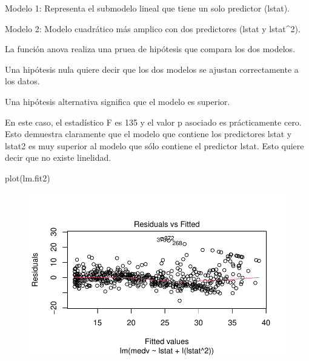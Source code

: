 \documentclass[
  letterpaper,
  DIV=11,
  numbers=noendperiod]{scrartcl}
\newenvironment{Shaded}{\begin{snugshade}}{\end{snugshade}}
\newcommand{\FunctionTok}[1]{\textcolor[rgb]{0.28,0.35,0.67}{#1}}
\newcommand{\NormalTok}[1]{\textcolor[rgb]{0.00,0.23,0.31}{#1}}
\begin{document}
Modelo 1: Representa el submodelo lineal que tiene un solo predictor
(lstat).

Modelo 2: Modelo cuadrático más amplico con dos predictores (lstat y
lstat\^{}2).

La función anova realiza una pruea de hipótesis que compara los dos
modelos.

Una hipótesis nula quiere decir que los dos modelos se ajustan
correctamente a los datos.

Una hipótesis alternativa significa que el modelo es superior.

En este caso, el estadístico F es 135 y el valor p asociado es
prácticamente cero. Esto demuestra claramente que el modelo que contiene
los predictores lstat y lstat2 es muy superior al modelo que sólo
contiene el predictor lstat. Esto quiere decir que no existe linelidad.

\begin{Shaded}
\begin{Highlighting}[]
\FunctionTok{plot}\NormalTok{(lm.fit2)}
\end{Highlighting}
\end{Shaded}

\begin{figure}[H]

{\centering \includegraphics{Resumen-2---3_files/figure-pdf/unnamed-chunk-21-1.pdf}

}

\end{figure}
\end{document}
